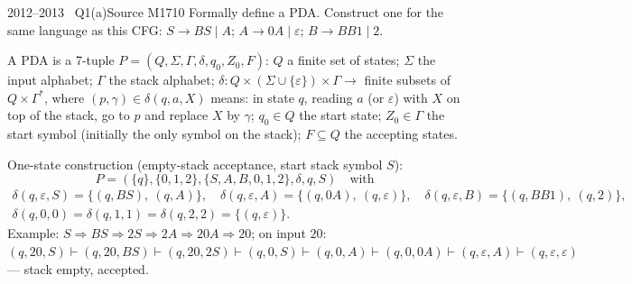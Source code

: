 \documentclass[11pt,a4paper]{article}
\newcommand{\eps}{\varepsilon}
\begin{document}
\begin{question}{2012--2013 \textbullet\ Q1(a)}{Source M17}{10}
Formally define a PDA. Construct one for the same language as this CFG: $S\to BS\mid A$; $A\to0A\mid\eps$; $B\to BB1\mid2$.
\end{question}
\begin{solution}
A PDA is a 7-tuple $P=(Q,\Sigma,\Gamma,\delta,q_0,Z_0,F)$: $Q$ a finite set of states; $\Sigma$ the input alphabet; $\Gamma$ the stack alphabet; $\delta:Q\times(\Sigma\cup\{\eps\})\times\Gamma\to$ finite subsets of $Q\times\Gamma^*$, where $(p,\gamma)\in\delta(q,a,X)$ means: in state $q$, reading $a$ (or $\eps$) with $X$ on top of the stack, go to $p$ and replace $X$ by $\gamma$; $q_0\in Q$ the start state; $Z_0\in\Gamma$ the start symbol (initially the only symbol on the stack); $F\subseteq Q$ the accepting states.

One-state construction (empty-stack acceptance, start stack symbol $S$):
\[P=(\{q\},\{0,1,2\},\{S,A,B,0,1,2\},\delta,q,S)\quad\text{with}\]
\[\begin{array}{l}
\delta(q,\eps,S)=\{(q,BS),\ (q,A)\},\quad \delta(q,\eps,A)=\{(q,0A),\ (q,\eps)\},\quad \delta(q,\eps,B)=\{(q,BB1),\ (q,2)\},\\
\delta(q,0,0)=\delta(q,1,1)=\delta(q,2,2)=\{(q,\eps)\}.
\end{array}\]
Example: $S\Rightarrow BS\Rightarrow 2S\Rightarrow2A\Rightarrow20A\Rightarrow20$; on input $20$:
$(q,20,S)\vdash(q,20,BS)\vdash(q,20,2S)\vdash(q,0,S)\vdash(q,0,A)\vdash(q,0,0A)\vdash(q,\eps,A)\vdash(q,\eps,\eps)$ --- stack empty, accepted.
\end{solution}
\end{document}
